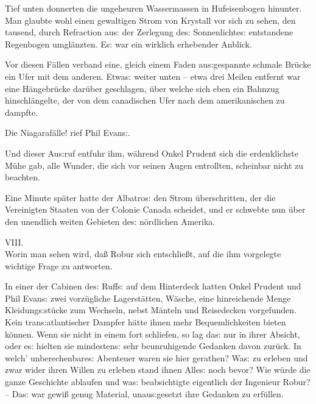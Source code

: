 \documentclass[oneside,12pt]{book}
\newenvironment{antiqua}{\normalfont}{}
\newcommand{\s}{s:}
\begin{document}
Tief unten donnerten die ungeheuren Wassermassen in Hufeisenbogen
hinunter. Man glaubte wohl einen gewaltigen Strom von Krystall vor
sich zu sehen, den tausend, durch Refraction au{\s} der Zerlegung
de{\s} Sonnenlichte{\s} entstandene Regenbogen umgl\"anzten. E{\s}
war ein wirklich erhebender Anblick.

Vor diesen F\"allen verband eine, gleich einem Faden au{\s}gespannte
schmale Br\"ucke ein Ufer mit dem anderen. Etwa{\s} weiter unten --
etwa drei Meilen entfernt war eine H\"angebr\"ucke dar\"uber
geschlagen, \"uber welche sich eben ein Bahnzug hinschl\"angelte, der
von dem canadischen Ufer nach dem amerikanischen zu dampfte.

{\glqq}Die Niagaraf\"alle!{\grqq} rief Phil Evan{\s}.

Und dieser Au{\s}ruf entfuhr ihm, w\"ahrend Onkel Prudent sich die
erdenklichste M\"uhe gab, alle Wunder, die sich vor seinen Augen
entrollten, scheinbar nicht zu beachten.

Eine Minute sp\"ater hatte der {\glqq}Albatro{\s}{\grqq} den Strom
\"uberschritten, der die Vereinigten Staaten von der Colonie Canada
scheidet, und er schwebte nun \"uber den unendlich weiten Gebieten
de{\s} n\"ordlichen Amerika.



\newpage\begin{center}\label{kap08}
{\large \begin{antiqua}VIII.\end{antiqua}\\
Worin man sehen wird, da{\ss} Robur sich entschlie{\ss}t, auf 
die ihm vorgelegte wichtige Frage zu antworten.\\\bigskip}
\end{center}



In einer der Cabinen de{\s} Ruff{\s} auf dem Hinterdeck hatten Onkel
Prudent und Phil Evan{\s} zwei vorz\"ugliche Lagerst\"atten,
W\"asche, eine hinreichende Menge Kleidung{\s}st\"ucke zum Wechseln,
nebst M\"anteln und Reisedecken vorgefunden. Kein tran{\s}atlantischer
Dampfer h\"atte ihnen mehr Bequemlichkeiten bieten k\"onnen. Wenn sie
nicht in einem fort schliefen, so lag da{\s} nur in ihrer Absicht,
oder e{\s} hielten sie mindesten{\s} sehr beunruhigende Gedanken
davon zur\"uck. In welch' unberechenbare{\s} Abenteuer waren sie hier
gerathen? Wa{\s} zu erleben und zwar wider ihren Willen zu erleben
stand ihnen Alle{\s} noch bevor? Wie w\"urde die ganze Geschichte
ablaufen und wa{\s} beabsichtigte eigentlich der Ingenieur Robur? --
Da{\s} war gewi{\ss} genug Material, unau{\s}gesetzt ihre Gedanken zu
erf\"ullen.
\end{document}
